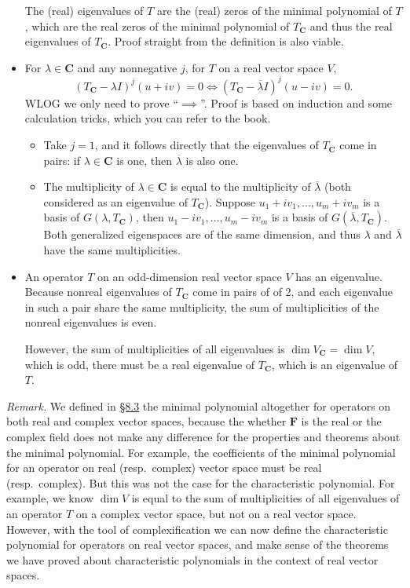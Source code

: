 \documentclass[11pt]{article}
\newcommand{\lk}[2]{\hyperlink{subsection.#1.#2}{\S#1.#2}}
\newcommand{\C}{\mathbf{C}}
\newcommand{\F}{\mathbf{F}}
\renewcommand{\d}{\dim}
\newcommand{\conj}[1]{\overline{#1}}
\begin{document}
\begin{itemize}
    The (real) eigenvalues of $T$ are the (real) zeros of the minimal polynomial of $T$, which are the real zeros of the minimal polynomial of $T_\C$ and thus the real eigenvalues of $T_\C$. Proof straight from the definition is also viable.
    \item For $\lambda \in \C$ and any nonnegative $j$, for $T$ on a real vector space $V$, \[(T_\C - \lambda I)^j (u+iv) = 0 \iff (T_\C - \conj{\lambda} I)^j (u-iv) = 0.\] WLOG we only need to prove ``$\implies$''. Proof is based on induction and some calculation tricks, which you can refer to the book.
    \begin{itemize}
        \item Take $j = 1$, and it follows directly that the eigenvalues of $T_\C$ come in pairs: if $\lambda \in \C$ is one, then $\conj{\lambda}$ is also one.
        \item The multiplicity of $\lambda \in \C$ is equal to the multiplicity of $\conj{\lambda}$ (both considered as an eigenvalue of $T_\C$). Suppose $u_1+iv_1,\dots,u_m+iv_m$ is a basis of $G(\lambda, T_\C)$, then $u_1-iv_1,\dots,u_m-iv_m$ is a basis of  $G(\conj{\lambda}, T_\C)$. Both generalized eigenspaces are of the same dimension, and thus $\lambda$ and $\conj{\lambda}$ have the same multiplicities.
    \end{itemize}
    \item An operator $T$ on an odd-dimension real vector space $V$ has an eigenvalue. Because nonreal eigenvalues of $T_\C$ come in pairs of of 2, and each eigenvalue in such a pair share the same multiplicity, the sum of multiplicities of the nonreal eigenvalues is even.
    
    However, the sum of multiplicities of all eigenvalues is $\d V_\C = \d V$, which is odd, there must be a real eigenvalue of $T_\C$, which is an eigenvalue of $T$.
\end{itemize}
\textit{Remark.} We defined in \lk{8}{3} the minimal polynomial altogether for operators on both real and complex vector spaces, because the whether $\F$ is the real or the complex field does not make any difference for the properties and theorems about the minimal polynomial. For example, the coefficients of the minimal polynomial for an operator on real (resp.\ complex) vector space must be real (resp.\ complex). But this was not the case for the characteristic polynomial. For example, we know $\d V$ is equal to the sum of multiplicities of all eigenvalues of an operator $T$ on a complex vector space, but not on a real vector space. However, with the tool of complexification we can now define the characteristic polynomial for operators on real vector spaces, and make sense of the theorems we have proved about characteristic polynomials in the context of real vector spaces.
\end{document}
